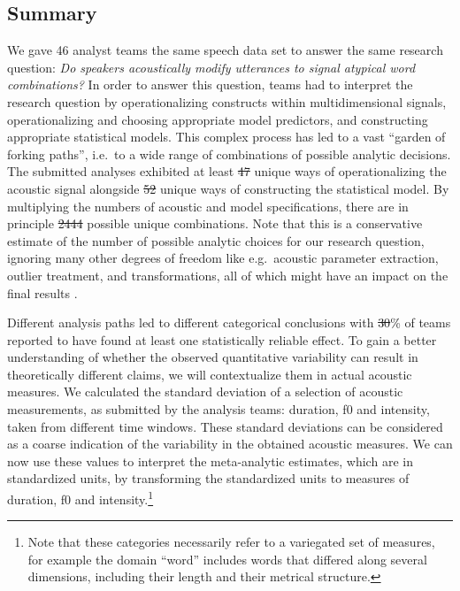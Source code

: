 \documentclass[Review,times,sageh]{sagej}
\providecommand{\DIFaddtex}[1]{{\protect\color{blue}\uwave{#1}}} %
\providecommand{\DIFdeltex}[1]{{\protect\color{red}\sout{#1}}}                      %
\providecommand{\DIFaddbegin}{} %
\providecommand{\DIFaddend}{} %
\providecommand{\DIFdelbegin}{} %
\providecommand{\DIFdelend}{} %
\providecommand{\DIFadd}[1]{\texorpdfstring{\DIFaddtex{#1}}{#1}} %
\providecommand{\DIFdel}[1]{\texorpdfstring{\DIFdeltex{#1}}{}} %
\begin{document}
\hypertarget{summary}{%
\subsection{Summary}\label{summary}}

We gave 46 analyst teams the same speech data set to answer the same research question: \emph{Do
speakers acoustically modify utterances to signal atypical word combinations?}
In order to answer this question, teams had to interpret the research question by
operationalizing constructs within multidimensional signals, operationalizing and choosing appropriate model predictors, and constructing appropriate statistical models.
This complex process has led to a vast ``garden of forking paths'', i.e.~to a wide range of combinations of possible analytic decisions.
The submitted analyses exhibited at least \DIFdelbegin \DIFdel{47 }\DIFdelend \DIFaddbegin \DIFadd{52 }\DIFaddend unique ways of operationalizing the acoustic signal alongside \DIFdelbegin \DIFdel{52 }\DIFdelend \DIFaddbegin \DIFadd{55 }\DIFaddend unique ways of constructing the statistical model.
By multiplying the numbers of acoustic and model specifications, there are in principle \DIFdelbegin \DIFdel{2444 }\DIFdelend \DIFaddbegin \DIFadd{2860 }\DIFaddend possible unique combinations.
Note that this is a conservative estimate of the number of possible analytic choices for our research question, ignoring many other degrees of freedom like e.g.~acoustic parameter extraction, outlier treatment, and transformations, all of which might have an impact on the final results \citep{breznau2021observing}.

Different analysis paths led to different categorical conclusions with \DIFdelbegin \DIFdel{30}\DIFdelend \DIFaddbegin \DIFadd{39.4}\DIFaddend \% of teams reported to have found at least one statistically reliable effect.
To gain a better understanding of whether the observed quantitative variability can result in theoretically different claims, we will contextualize them in actual acoustic measures.
We calculated the standard deviation of a selection of acoustic measurements, as submitted by the analysis teams: duration, f0 and intensity, taken from different time windows.
These standard deviations can be considered as a coarse indication of the variability in the obtained acoustic measures.
We can now use these values to interpret the meta-analytic estimates, which are in standardized units, by transforming the standardized units to measures of duration, f0 and intensity.\footnote{Note that these categories necessarily refer to a variegated set of measures, for example the domain ``word'' includes words that differed along several dimensions, including their length and their metrical structure.}
\end{document}
